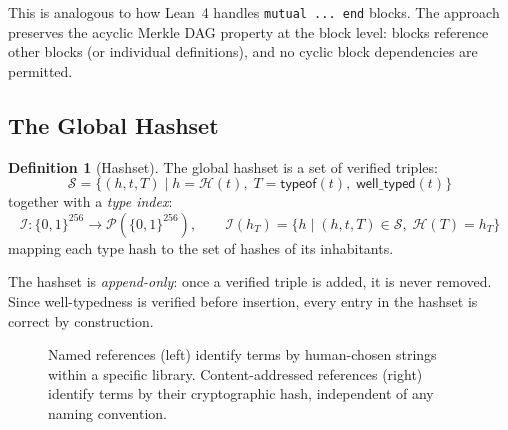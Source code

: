 \documentclass[11pt]{article}
\theoremstyle{definition}
\newtheorem{definition}{Definition}[section]
\theoremstyle{plain}
\theoremstyle{remark}
\newcommand{\hash}{\mathcal{H}}
\newcommand{\hashset}{\mathcal{S}}
\newcommand{\typeindex}{\mathcal{I}}
\begin{document}
This is analogous to how Lean~4 handles \texttt{mutual ... end} blocks.
The approach preserves the acyclic Merkle DAG property at the block level: blocks reference
other blocks (or individual definitions), and no cyclic block dependencies are permitted.

\subsection{The Global Hashset}
\label{sec:hashset}

\begin{definition}[Hashset]
The global hashset is a set of verified triples:
\[
  \hashset = \{ (h, t, T) \mid h = \hash(t),\; T = \textsf{typeof}(t),\; \textsf{well\_typed}(t) \}
\]
together with a \emph{type index}:
\[
  \typeindex : \{0,1\}^{256} \to \mathcal{P}(\{0,1\}^{256}), \qquad
  \typeindex(h_T) = \{ h \mid (h, t, T) \in \hashset,\; \hash(T) = h_T \}
\]
mapping each type hash to the set of hashes of its inhabitants.
\end{definition}

The hashset is \emph{append-only}: once a verified triple is added, it is never removed.
Since well-typedness is verified before insertion, every entry in the hashset is correct by construction.

\begin{figure}[t]
\centering
{}
\caption{Named references (left) identify terms by human-chosen strings within a specific library.
Content-addressed references (right) identify terms by their cryptographic hash, independent of any naming convention.}
\label{fig:named-vs-hashed}
\end{figure}
\end{document}
